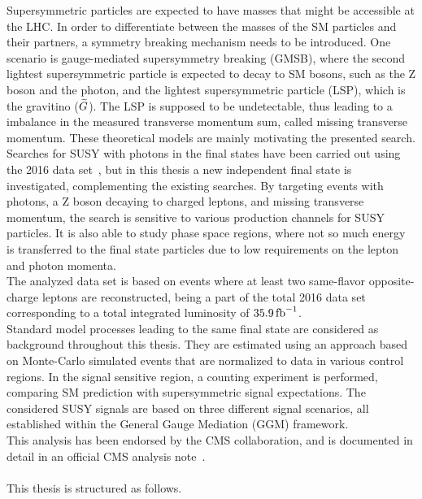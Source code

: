 Supersymmetric particles are expected to have masses that might be accessible at the LHC. In order to differentiate between the masses of the SM particles and their partners, a symmetry breaking mechanism needs to be introduced. One scenario is gauge-mediated supersymmetry breaking (GMSB), where the second lightest supersymmetric particle is expected to decay to SM bosons, such as the Z boson and the photon, and the lightest supersymmetric particle (LSP), which is the gravitino ($\widetilde{G}$). The LSP is supposed to be undetectable, thus leading to a imbalance in the measured transverse momentum sum, called missing transverse momentum. These theoretical models are mainly motivating the presented search.\\
Searches for SUSY with photons in the final states have been carried out using the 2016 data set~\cite{PhotonHT,PhotonMet,PhotonBJet,PhotonLepton}, but in this thesis a new independent final state is investigated, complementing the existing searches. By targeting events with photons, a Z boson decaying to charged leptons, and missing transverse momentum, the search is sensitive to various production channels for SUSY particles. It is also able to study phase space regions, where not so much energy is transferred to the final state particles due to low requirements on the lepton and photon momenta.\\
The analyzed data set is based on events where at least two same-flavor opposite-charge leptons are reconstructed, being a part of the total 2016 data set corresponding to a total integrated luminosity of $35.9\mbox{\ensuremath{\,\text{fb}^\text{$-$1}}}$.\\
Standard model processes leading to the same final state are considered as background throughout this thesis. They are estimated using an approach based on Monte-Carlo simulated events that are normalized to data in various control regions. In the signal sensitive region, a counting experiment is performed, comparing SM prediction with supersymmetric signal expectations. The considered SUSY signals are based on three different signal scenarios, all established within the General Gauge Mediation (GGM) framework.\\
This analysis has been endorsed by the CMS collaboration, and is documented in detail in an official CMS analysis note~\cite{MyAN}.\\\\
This thesis is structured as follows.

